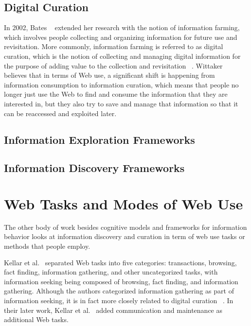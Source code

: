 {\subsection{Digital Curation}

In 2002, Bates ~\cite{bates2002} extended her research with the notion of information farming, which involves people collecting and organizing information for future use and revisitation. More commonly, information farming is referred to as digital curation, which is the notion of collecting and managing digital information for the purpose of adding value to the collection and revisitation ~\cite{beagrie}. Wittaker ~\cite{wittaker} believes that in terms of Web use, a significant shift is happening from information consumption to information curation, which means that people no longer just use the Web to find and consume the information that they are interested in, but they also try to save and manage that information so that it can be reaccessed and exploited later. 




{\subsection{Information Exploration Frameworks}



}

{\subsection{Information Discovery Frameworks}



}


{\section{Web Tasks and Modes of Web Use}
The other body of work besides cognitive models and frameworks for information behavior looks at information discovery and curation in term of web use tasks or methods that people employ.

Kellar et al.~\cite{kellar2006goal} separated Web tasks into five categories: transactions, browsing, fact finding, information gathering, and other uncategorized tasks, with information seeking being composed of browsing, fact finding, and information gathering. Although the authors categorized information gathering as part of information seeking, it is in fact more closely related to digital curation ~\cite{beagrie, wittaker}. In their later work, Kellar et al.~\cite{kellar2007field} added communication and maintenance as additional Web tasks. 

}}
